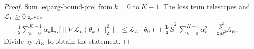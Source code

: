 \documentclass[reqno, 11pt]{amsart}%
\newcommand\cL{\mathcal L}
\newcommand\EE{\mathbb E}
\theoremstyle{definition}
\begin{document}
\begin{proof}
Sum \eqref{eq:avg-bound-pre} from $k=0$ to $K-1$. The loss term telescopes and $\cL_{L}\ge 0$ gives
\begin{align}
\label{eq:sum-bound}
\frac12\sum_{k=0}^{K-1}\alpha_k\EE_G\!\Big[\|\nabla \cL_{L}(\theta_k)\|_2^2\ \Big]
&\le
\cL_{L}(\theta_0)+ \frac{\mathbf{L}}{2}  \,  \hat{S}^2 \,\sum_{k=0}^{K-1}\alpha_k^2+ \frac{\hat{S}^2}{2 M^2} A_K.
\end{align}
Divide by $A_K$ to obtain the statement.
\end{proof}
\end{document}
